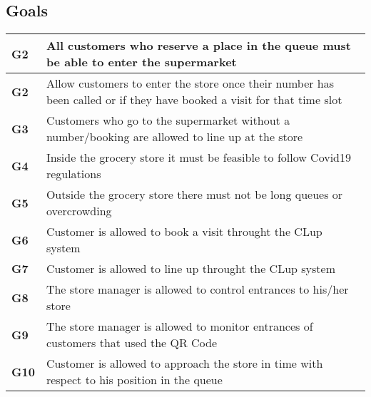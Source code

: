 \subsection{Goals}
\begin{center}
    {\renewcommand{\arraystretch}{2}%
    \begin{tabular}{L{2cm}L{12cm}}
        \hline
        \textbf{G2} & All customers who reserve a place in the queue must be able to enter the supermarket \\
        \hline
        \textbf{G2} & Allow customers to enter the store once their number has been called or if they have booked a visit for that time slot \\
        \hline
        \textbf{G3} & Customers who go to the supermarket without a number/booking are allowed to line up at the store \\
        \hline
        \textbf{G4} & Inside the grocery store it must be feasible to follow Covid19 regulations \\
        \hline
        \textbf{G5} & Outside the grocery store there must not be long queues or overcrowding \\
        \hline
        \textbf{G6} & Customer is allowed to book a visit throught the CLup system \\
        \hline
        \textbf{G7} & Customer is allowed to line up throught the CLup system \\
        \hline
        \textbf{G8} & The store manager is allowed to control entrances to his/her store \\
        \hline
        \textbf{G9} & The store manager is allowed to monitor entrances of customers that used the QR Code \\
        \hline
        \textbf{G10} & Customer is allowed to approach the store in time with respect to his position in the queue \\
        \hline
    \end{tabular}}
\end{center}